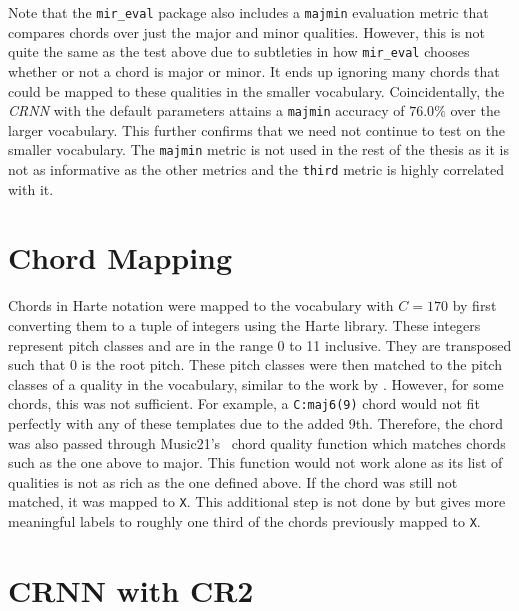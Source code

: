 Note that the \texttt{mir\_eval} package also includes a \texttt{majmin} evaluation metric that compares chords over just the major and minor qualities. However, this is not quite the same as the test above due to subtleties in how \texttt{mir\_eval} chooses whether or not a chord is major or minor. It ends up ignoring many chords that could be mapped to these qualities in the smaller vocabulary. Coincidentally, the \emph{CRNN} with the default parameters attains a \texttt{majmin} accuracy of $76.0\%$ over the larger vocabulary. This further confirms that we need not continue to test on the smaller vocabulary. The  \texttt{majmin} metric is not used in the rest of the thesis as it is not as informative as the other metrics and the \texttt{third} metric is highly correlated with it.

\section{Chord Mapping}\label{app:chord_mapping}

Chords in Harte notation were mapped to the vocabulary with $C=170$ by first converting them to a tuple of integers using the Harte library. These integers represent pitch classes and are in the range 0 to 11 inclusive. They are transposed such that 0 is the root pitch. These pitch classes were then matched to the pitch classes of a quality in the vocabulary, similar to the work by \citet{StructuredTraining}. However, for some chords, this was not sufficient. For example, a \texttt{C:maj6(9)} chord would not fit perfectly with any of these templates due to the added 9th. Therefore, the chord was also passed through Music21's~\citep{music21} chord quality function which matches chords such as the one above to major. This function would not work alone as its list of qualities is not as rich as the one defined above. If the chord was still not matched, it was mapped to \texttt{X}. This additional step is not done by \citet{StructuredTraining} but gives more meaningful labels to roughly one third of the chords previously mapped to \texttt{X}.

\section{CRNN with CR2}\label{app:crnn_with_cr2}

